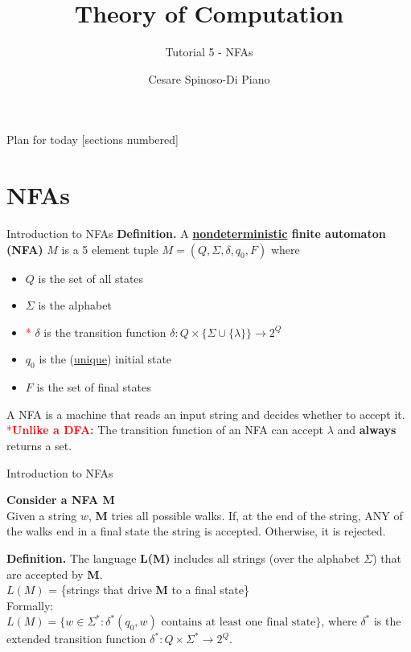 \documentclass[10pt]{beamer}
\title{Theory of Computation}
\subtitle{Tutorial 5 - NFAs}
\date{}
\author{Cesare Spinoso-Di Piano}
\begin{document}
\maketitle

\begin{frame}{Plan for today}
    [sections numbered]
    \tableofcontents[hideallsubsections]
\end{frame}


\section{NFAs}

\begin{frame}[t]{Introduction to NFAs}
    \textbf{Definition.} A \textbf{\underline{nondeterministic} finite automaton (NFA)} $M$ is a 5 element tuple $M = (Q, \Sigma, \delta, q_0, F)$ where
    \begin{itemize}
        \item $Q$ is the set of all states
        \item $\Sigma$ is the alphabet
        \item \textcolor{red}{*} $\delta$ is the transition function $\delta: Q \times \{\Sigma \cup \{\lambda\} \} \rightarrow 2^Q$
        \item $q_0$ is the (\underline{unique}) initial state
        \item $F$ is the set of final states
    \end{itemize}
    A NFA is a machine that reads an input string and decides whether to accept it.\\
    \textcolor{red}{*\textbf{Unlike a DFA: }}
    The transition function of an NFA can accept $\lambda$ and \textbf{always} returns a set.
\end{frame}


\begin{frame}{Introduction to NFAs}

    \textbf{Consider a NFA M}\\
    Given a string $w$, \textbf{M} tries all possible walks. If, at the end of the string, ANY of the walks end in a final state the string is accepted. Otherwise, it is rejected.\\\bigskip

    \textbf{Definition.} The language \textbf{L(M)} includes all strings (over the alphabet $\Sigma$) that are accepted by \textbf{M}.\\
    {$L(M)$} = \{strings that drive \textbf{M} to a final state\}\\\bigskip
    Formally:\\
    $L(M) = \{w\in \Sigma ^*: \delta ^*(q_0,w) \text{ contains at least one final state}\}$, where $\delta ^*$ is the extended transition function $\delta ^*: Q\times \Sigma ^*\rightarrow 2^Q$.
\end{frame}
\end{document}

